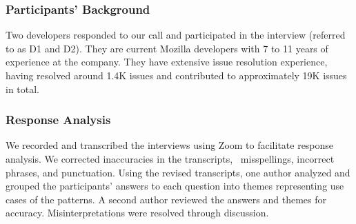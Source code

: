 {\subsubsection{\textbf{Participants' Background}} 
Two developers responded to our call and participated in the interview (\ie referred to as D1 and D2). They are current Mozilla developers with 7 to 11 years of experience at the company.
They have extensive issue resolution experience, having resolved around 1.4K issues and contributed to approximately 19K issues in total. %


\subsubsection{\textbf{Response Analysis}} We recorded and transcribed the interviews using Zoom to facilitate response analysis. We corrected inaccuracies in the transcripts, \eg\ misspellings, incorrect phrases, and punctuation. 
Using the revised transcripts, one author analyzed and grouped the participants’ answers to each question into themes representing use cases of the patterns. A second author reviewed the answers and themes for accuracy. Misinterpretations were resolved through discussion.
}


